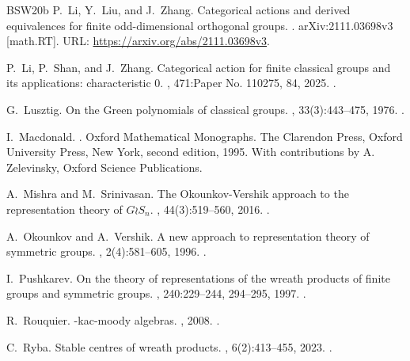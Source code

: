 \documentclass[12pt]{amsart}
\numberwithin{itemcounter}{subsection}
\theoremstyle{plain}
\theoremstyle{definition}
\theoremstyle{remark}
\numberwithin{equation}{section}
\begin{document}
\begin{thebibliography}{BSW20b}
P.~Li, Y.~Liu, and J.~Zhang.
\newblock Categorical actions and derived equivalences for finite
  odd-dimensional orthogonal groups.
.
\newblock arXiv:2111.03698v3 [math.RT].
\newblock URL: \url{https://arxiv.org/abs/2111.03698v3}.

P.~Li, P.~Shan, and J.~Zhang.
\newblock Categorical action for finite classical groups and its applications:
  characteristic 0.
, 471:Paper No. 110275, 84, 2025.
\newblock \href {https://doi.org/10.1016/j.aim.2025.110275}
  {}.

G.~Lusztig.
\newblock On the Green polynomials of classical groups.
, 33(3):443--475, 1976.
\newblock \href {https://doi.org/10.1112/plms/s3-33.3.443}
  {}.

I.~Macdonald.
.
\newblock Oxford Mathematical Monographs. The Clarendon Press, Oxford
  University Press, New York, second edition, 1995.
\newblock With contributions by A. Zelevinsky, Oxford Science Publications.

A.~Mishra and M.~Srinivasan.
\newblock The {O}kounkov-{V}ershik approach to the representation theory of
  {$G\wr S_n$}.
, 44(3):519--560, 2016.
\newblock \href {https://doi.org/10.1007/s10801-016-0679-5}
  {}.

A.~Okounkov and A.~Vershik.
\newblock A new approach to representation theory of symmetric groups.
, 2(4):581--605, 1996.
\newblock \href {https://doi.org/10.1007/PL00001384}
  {}.

I.~Pushkarev.
\newblock On the theory of representations of the wreath products of finite
  groups and symmetric groups.
, 240:229--244, 294--295, 1997.
\newblock \href {https://doi.org/10.1007/BF02175835}
  {}.

R.~Rouquier.
-kac-moody algebras.
, 2008.
\newblock \href {https://arxiv.org/abs/0812.5023} {}.

C.~Ryba.
\newblock Stable centres of wreath products.
, 6(2):413--455, 2023.
\newblock \href {https://doi.org/10.5802/alco.264}
  {}.


\end{thebibliography}
\end{document}
